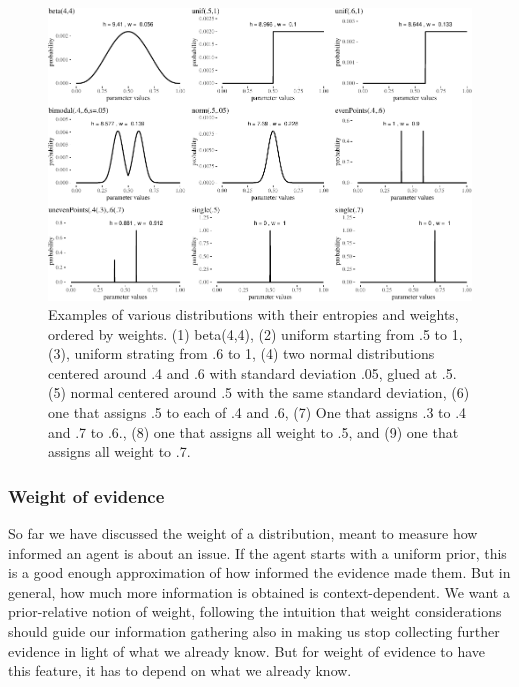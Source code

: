 \documentclass[
  10pt,
  dvipsnames,enabledeprecatedfontcommands]{scrartcl}
\begin{document}
\begin{figure}[H]

\begin{center}\includegraphics[width=1\linewidth]{chapter-outline_files/figure-latex/fig:weightsWeird-1} \end{center}
\caption{Examples of various distributions with their entropies and weights, ordered by weights. (1) beta(4,4), (2) uniform starting from .5 to 1, (3), uniform strating from .6 to 1, (4) two normal distributions centered around .4 and .6 with standard deviation .05, glued at .5. (5) normal centered around .5 with the same standard deviation, (6) one that assigns .5 to each of .4  and .6, (7) One that assigns .3 to .4 and .7 to .6., (8) one that assigns all weight to .5, and (9) one that assigns all weight to .7.}

\label{fig:weightsWeird}
\end{figure}

\hypertarget{weight-of-evidence-1}{%
\subsubsection{Weight of evidence}\label{weight-of-evidence-1}}

So far we have discussed the weight of a distribution, meant to measure
how informed an agent is about an issue. If the agent starts with a
uniform prior, this is a good enough approximation of how informed the
evidence made them. But in general, how much more information is
obtained is context-dependent. We want a prior-relative notion of
weight, following the intuition that weight considerations should guide
our information gathering also in making us stop collecting further
evidence in light of what we already know. But for weight of evidence to
have this feature, it has to depend on what we already know.
\end{document}
